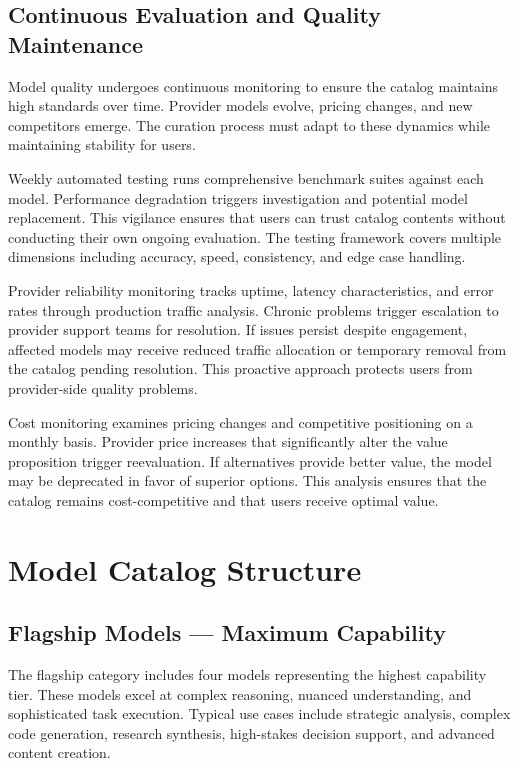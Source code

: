 \documentclass[12pt,a4paper,twoside]{report}
\begin{document}
\subsection{Continuous Evaluation and Quality Maintenance}

Model quality undergoes continuous monitoring to ensure the catalog maintains high standards over time. Provider models evolve, pricing changes, and new competitors emerge. The curation process must adapt to these dynamics while maintaining stability for users.

Weekly automated testing runs comprehensive benchmark suites against each model. Performance degradation triggers investigation and potential model replacement. This vigilance ensures that users can trust catalog contents without conducting their own ongoing evaluation. The testing framework covers multiple dimensions including accuracy, speed, consistency, and edge case handling.

Provider reliability monitoring tracks uptime, latency characteristics, and error rates through production traffic analysis. Chronic problems trigger escalation to provider support teams for resolution. If issues persist despite engagement, affected models may receive reduced traffic allocation or temporary removal from the catalog pending resolution. This proactive approach protects users from provider-side quality problems.

Cost monitoring examines pricing changes and competitive positioning on a monthly basis. Provider price increases that significantly alter the value proposition trigger reevaluation. If alternatives provide better value, the model may be deprecated in favor of superior options. This analysis ensures that the catalog remains cost-competitive and that users receive optimal value.

\section{Model Catalog Structure}

\subsection{Flagship Models — Maximum Capability}

The flagship category includes four models representing the highest capability tier. These models excel at complex reasoning, nuanced understanding, and sophisticated task execution. Typical use cases include strategic analysis, complex code generation, research synthesis, high-stakes decision support, and advanced content creation.
\end{document}
